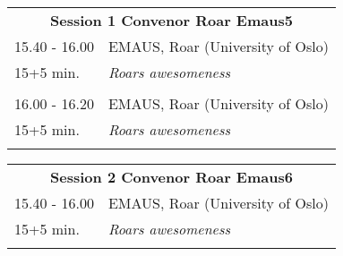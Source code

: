 \begin{longtable}[h!]
\begin{tabular}{p{3cm}p{13cm}}
\multicolumn{2}{c}{{\bf Session 1  \hfill Convenor Roar Emaus5}}\\ 
 15.40 - 16.00 & EMAUS, Roar (University of Oslo)\\ 
15+5 min. & {\it Roars awesomeness}\\ 
 & \\ 16.00 - 16.20 & EMAUS, Roar (University of Oslo)\\ 
15+5 min. & {\it Roars awesomeness}\\ 
 & \\ \end{tabular}
\end{longtable}

\hspace*{-10cm}
\begin{longtable}[h!]
\begin{tabular}{p{3cm}p{13cm}}
\multicolumn{2}{c}{{\bf Session 2  \hfill Convenor Roar Emaus6}}\\ 
 15.40 - 16.00 & EMAUS, Roar (University of Oslo)\\ 
15+5 min. & {\it Roars awesomeness}\\ 
 & \\ \end{tabular}
\end{longtable}

\hspace*{-10cm}
